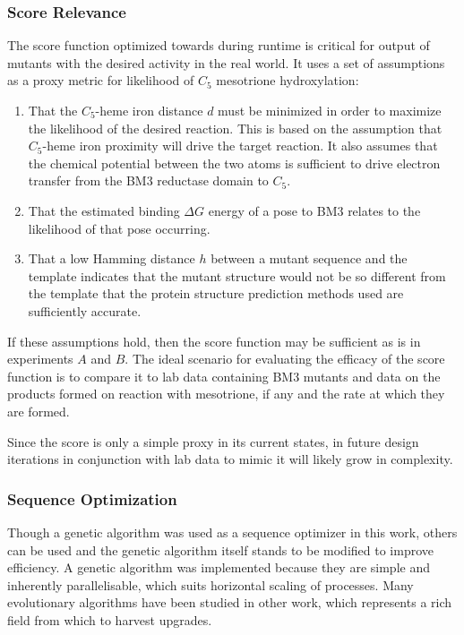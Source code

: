 \documentclass[16pt]{book}
\begin{document}
\subsubsection{Score Relevance}
 The score function optimized towards during runtime is critical for output of mutants with the desired activity in the real world.
 It uses a set of assumptions as a proxy metric for likelihood of $C_5$ mesotrione hydroxylation:
 \begin{enumerate}
	\item That the $C_5$-heme iron distance $d$ must be minimized in order to maximize the likelihood of the desired reaction.
	      This is based on the assumption that $C_5$-heme iron proximity will drive the target reaction.
	      It also assumes that the chemical potential between the two atoms is sufficient to drive electron transfer from the BM3 reductase domain to $C_5$.
	\item That the estimated binding $\Delta G$ energy of a pose to BM3 relates to the likelihood of that pose occurring. 
	\item That a low Hamming distance $h$ between a mutant sequence and the template indicates that the mutant structure would not be so different from the template that the protein structure prediction methods used are sufficiently accurate.
 \end{enumerate}

If these assumptions hold, then the score function may be sufficient as is in experiments $A$ and $B$.
The ideal scenario for evaluating the efficacy of the score function is to compare it to lab data containing BM3 mutants and data on the products formed on reaction with mesotrione, if any and the rate at which they are formed.

Since the score is only a simple proxy in its current states, in future design iterations in conjunction with lab data to mimic it will likely grow in complexity.

\subsubsection{Sequence Optimization}

Though a genetic algorithm was used as a sequence optimizer in this work, others can be used and the genetic algorithm itself stands to be modified to improve efficiency.
A genetic algorithm was implemented because they are simple and inherently parallelisable, which suits horizontal scaling of processes.
Many evolutionary algorithms have been studied in other work, which represents a rich field from which to harvest upgrades.
\end{document}
